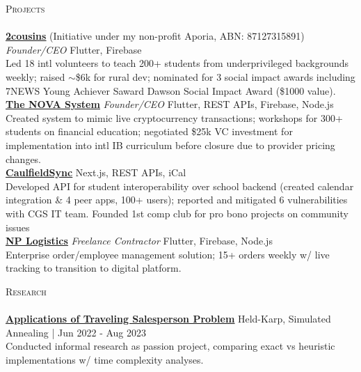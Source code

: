 \documentclass[a4paper]{article}
\newcommand{\lineunder} {
    \vspace*{-8pt} \\
    \hspace*{-10pt} \hrulefill \\
}
\newcommand{\header} [1] {
    {\hspace*{-10pt}\vspace*{6pt} \textsc{#1}}
    \vspace*{-6pt} \lineunder
}
\begin{document}
\header{Projects}
\href{https://2cousins.org/}{\textbf{\ul{2cousins}}} (Initiative under my non-profit Aporia, ABN: 87127315891) \textit{Founder/CEO} {\textsl{\hfill} Flutter, Firebase}\\
Led 18 intl volunteers to teach 200+ students from underprivileged backgrounds weekly; raised $\sim$\$6k for rural dev; nominated for 3 social impact awards including 7NEWS Young Achiever Saward Dawson Social Impact Award (\$1000 value).\\
\vspace*{1.5mm}
\href{https://the-nova-system.github.io/}{\textbf{\ul{The NOVA System}}} \textit{Founder/CEO} {\textsl{\hfill} Flutter, REST APIs, Firebase, Node.js}\\
Created system to mimic live cryptocurrency transactions; workshops for 300+ students on financial education; negotiated \$25k VC investment for implementation into intl IB curriculum before closure due to provider pricing changes.\\
\vspace*{1.5mm}
\href{https://caulfieldsync.vercel.app/}{\textbf{\ul{CaulfieldSync}}} {\textsl{\hfill} Next.js, REST APIs, iCal}\\
Developed API for student interoperability over school backend (created calendar integration \& 4 peer apps, 100+ users); reported and mitigated 6 vulnerabilities with CGS IT team.
Founded 1st comp club for pro bono projects on community issues\\
\vspace*{1.5mm}
\href{https://nplogistics.com.au}{\textbf{\ul{NP Logistics}}} \textit{Freelance Contractor} {\textsl{\hfill} Flutter, Firebase, Node.js}\\
Enterprise order/employee management solution; 15+ orders weekly w/ live tracking to transition to digital platform.\\
\vspace*{1.5mm}

\header{Research}
\href{https://garv-shah.github.io/applications_of_tsp.pdf}{\textbf{\ul{Applications of Traveling Salesperson Problem}}} \hfill Held-Karp, Simulated Annealing | Jun 2022 - Aug 2023\\
Conducted informal research as passion project, comparing exact vs heuristic implementations w/ time complexity analyses. \\
\vspace*{1.5mm}
\end{document}

